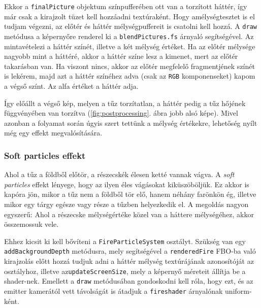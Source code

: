 Ekkor a \texttt{finalPicture} objektum színpufferében ott van a torzított háttér, így már csak a kirajzolt tüzet kell hozzáadni textúraként. Hogy amélységtesztet is el tudjam végezni, az előtér és háttér mélységpuffereit is csatolni kell hozzá. A \texttt{draw} metódusa a képernyőre renderel ki a \texttt{blendPictures.fs} árnyaló segítségével. Az mintavételezi a háttér színét, illetve a két mélység értéket. Ha az előtér mélysége nagyobb mint a háttéré, akkor a háttér színe lesz a kimenet, mert az előtér takarásban van. Ha viszont nincs, akkor az előtér megfelelő fragmentjének színét is lekérem, majd azt a háttér színéhez adva (csak az \texttt{RGB} komponenseket) kapom a végső színt. Az alfa értéket a háttér adja.

Így előállt a végső kép, melyen a tűz torzítatlan, a háttér pedig a tűz hőjének függvényében van torzítva (\ref{fig:postprocessing}. ábra jobb alsó képe). Mivel azonban a folyamat során úgyis szert tettünk a mélység értékekre, lehetőség nyílt még egy effekt megvalósítására.


\subsubsection{Soft particles effekt}
Ahol a tűz a földből előtör, a részecskék élesen ketté vannak vágva. A \textit{soft particles} effekt lényege, hogy az ilyen éles vágásokat kiküszöböljük. Ez akkor is kapóra jön, mikor a tűz nem a földből tör elő, hanem néhány farönkön ég, illetve mikor egy tárgy egésze vagy része a tűzben helyezkedik el. A megoldás nagyon egyszerű: Ahol a részecske mélységértéke közel van a háttere mélységéhez, akkor összemossuk vele.

Ehhez kicsit ki kell bővíteni a \texttt{FireParticleSystem} osztályt. Szükség van egy \texttt{addBackgroundDepth} metódusra, mely segítségével a \texttt{renderedFire} FBO-ba való kirajzolás előtt hozzá tudjuk adni a háttér mélység textúrájának azonosítóját az osztályhoz, illetve az\texttt{updateScreenSize}, mely a képernyő méreteit állítja be a shader-nek. Emellett a \texttt{draw} metódusában gondoskodni kell róla, hogy ezt, és az emitter kamerától vett távolságát is átadjuk a \texttt{fireshader} árnyalónak uniform-ként.

